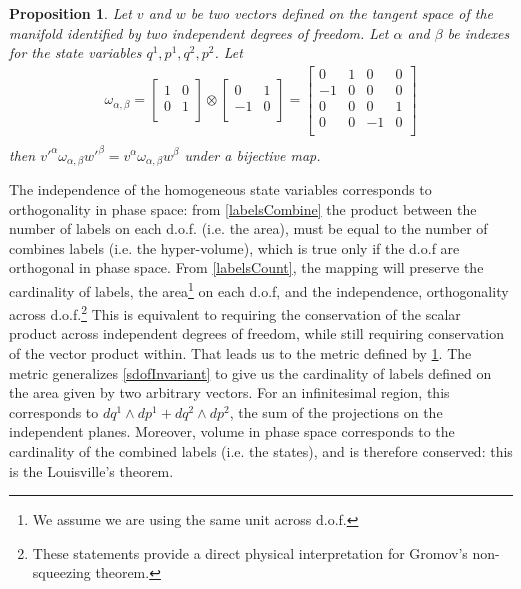 \documentclass[aps,pra,10pt,twocolumn,floatfix,nofootinbib]{revtex4-1}
\newtheorem{prop}[thm]{Proposition}
\theoremstyle{definition}
\begin{document}
\begin{prop}\label{mdofInvariant}
Let $v$ and $w$ be two vectors defined on the tangent space of the manifold identified by two independent degrees of freedom. Let $\alpha$ and $\beta$ be indexes for the state variables $q^1, p^1, q^2, p^2$. Let
\begin{align*}
\omega_{\alpha, \beta} =  \left[
  \begin{array}{cc}
    1 & 0 \\
    0 & 1 \\
  \end{array}
\right] \otimes \left[
  \begin{array}{cc}
    0 & 1 \\
    -1 & 0 \\
  \end{array}
\right] =
\left[
  \begin{array}{cccc}
    0 & 1 & 0 & 0 \\
    -1 & 0 & 0 & 0 \\
    0 & 0 & 0 & 1 \\
    0 & 0 & -1 & 0 \\
  \end{array}
\right] \\
\end{align*}
then $v'^{\alpha} \omega_{\alpha, \beta} w'^{\beta}=v^{\alpha} \omega_{\alpha, \beta} w^{\beta}$ under a bijective map.
\end{prop}

The independence of the homogeneous state variables corresponds to orthogonality in phase space: from \ref{labelsCombine} the product between the number of labels on each d.o.f. (i.e. the area), must be equal to the number of combines labels (i.e. the hyper-volume), which is true only if the d.o.f are orthogonal in phase space. From \ref{labelsCount}, the mapping will preserve the cardinality of labels, the area\footnote{We assume we are using the same unit across d.o.f.} on each d.o.f, and the independence, orthogonality across d.o.f.\footnote{These statements provide a direct physical interpretation for Gromov's non-squeezing theorem\cite{Gromov,deGosson,Stewart}.} This is equivalent to requiring the conservation of the scalar product across independent degrees of freedom, while still requiring conservation of the vector product within. That leads us to the metric defined by \ref{mdofInvariant}.
The metric generalizes \ref{sdofInvariant} to give us the cardinality of labels defined on the area given by two arbitrary vectors. For an infinitesimal region, this corresponds to $dq^1 \wedge dp^1 + dq^2 \wedge dp^2$, the sum of the projections on the independent planes. Moreover, volume in phase space corresponds to the cardinality of the combined labels (i.e. the states), and is therefore conserved: this is the Louisville's theorem.
\end{document}
